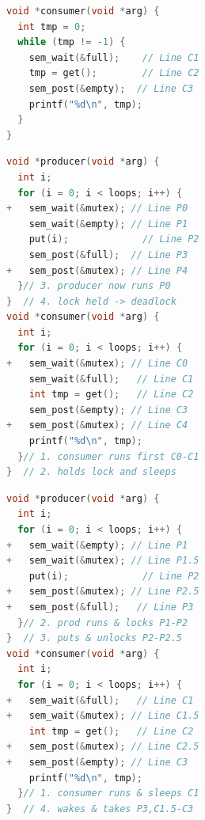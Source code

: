 \documentclass[8pt,a4paper,landscape]{extarticle}
\begin{document}
\begin{multicols*}{3}
\begin{minipage}{.5\linewidth}
\begin{lstlisting}[language=c,xleftmargin=2pt,xrightmargin=2pt]
void *consumer(void *arg) {
  int tmp = 0;
  while (tmp != -1) {
    sem_wait(&full);    // Line C1
    tmp = get();        // Line C2
    sem_post(&empty);  // Line C3
    printf("%d\n", tmp);
  }
}
\end{lstlisting}
\end{minipage}
\begin{minipage}{.5\linewidth}
\begin{lstlisting}[language=c,xleftmargin=2pt,xrightmargin=2pt,framexbottommargin=2pt]
void *producer(void *arg) {
  int i;
  for (i = 0; i < loops; i++) {
+   sem_wait(&mutex); // Line P0
    sem_wait(&empty); // Line P1
    put(i);             // Line P2
    sem_post(&full);  // Line P3
+   sem_post(&mutex); // Line P4
  }// 3. producer now runs P0
}  // 4. lock held -> deadlock
void *consumer(void *arg) {
  int i;
  for (i = 0; i < loops; i++) {
+   sem_wait(&mutex); // Line C0
    sem_wait(&full);   // Line C1
    int tmp = get();   // Line C2
    sem_post(&empty); // Line C3
+   sem_post(&mutex); // Line C4
    printf("%d\n", tmp);
  }// 1. consumer runs first C0-C1
}  // 2. holds lock and sleeps
\end{lstlisting}
\end{minipage}
\begin{minipage}{.5\linewidth}
\begin{lstlisting}[language=c,xleftmargin=4pt,xrightmargin=0pt,framexbottommargin=2pt]
void *producer(void *arg) {
  int i;
  for (i = 0; i < loops; i++) {
+   sem_wait(&empty); // Line P1
+   sem_wait(&mutex); // Line P1.5
    put(i);             // Line P2
+   sem_post(&mutex); // Line P2.5
+   sem_post(&full);   // Line P3
  }// 2. prod runs & locks P1-P2
}  // 3. puts & unlocks P2-P2.5
void *consumer(void *arg) {
  int i;
  for (i = 0; i < loops; i++) {
+   sem_wait(&full);   // Line C1
+   sem_wait(&mutex); // Line C1.5
    int tmp = get();   // Line C2
+   sem_post(&mutex); // Line C2.5
+   sem_post(&empty); // Line C3
    printf("%d\n", tmp);
  }// 1. consumer runs & sleeps C1
}  // 4. wakes & takes P3,C1.5-C3
\end{lstlisting}
\end{minipage}
\end{multicols*}
\end{document}
